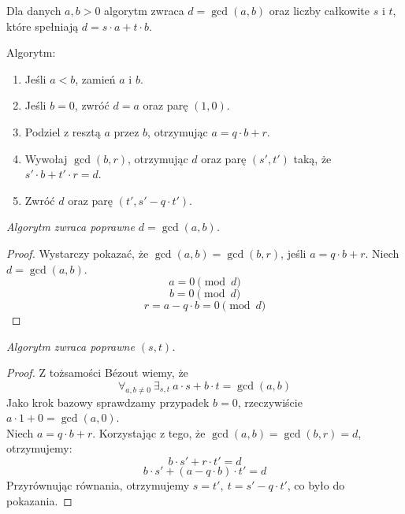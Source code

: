 Dla danych \( a, b > 0 \) algorytm zwraca \( d = \gcd(a,b) \) oraz liczby całkowite \( s \) i \( t \), które spełniają \( d = s\cdot a + t\cdot b \).

\begin{greyframe}
    Algorytm:
    \begin{enumerate}
        \item Jeśli \( a < b \), zamień \( a \) i \( b \).
        \item Jeśli \( b = 0 \), zwróć \( d = a \) oraz parę \( (1,0) \).
        \item Podziel z resztą \( a \) przez \( b \), otrzymując \( a = q \cdot b + r \).
        \item Wywołaj \( \gcd(b,r) \), otrzymując \( d \) oraz parę \( (s', t') \) taką, że \( s'\cdot b + t' \cdot r = d \).
        \item Zwróć \( d \) oraz parę \( (t', s' - q \cdot t') \).
    \end{enumerate}
\end{greyframe}

\vspace{1em}\noindent
\textit{Algorytm zwraca poprawne \( d = \gcd(a, b) \).}
\begin{proof}
    Wystarczy pokazać, że \( \gcd(a, b) = \gcd(b, r) \), jeśli \( a = q \cdot b + r \). Niech \( d = \gcd(a, b) \).
    \[
        a = 0 \pmod{d}
    \]
    \[
        b = 0 \pmod{d}
    \]
    \[
        r = a - q \cdot b = 0 \pmod{d}
    \]
\end{proof}
\textit{Algorytm zwraca poprawne \( (s, t) \).}
\begin{proof}
    Z tożsamości B\'ezout wiemy, że
    \[
        \forall_{a, b \not= 0 } \ \exists_{s, t} \ a \cdot s + b \cdot t = \gcd(a, b)
    \]
    Jako krok bazowy sprawdzamy przypadek \( b = 0 \), rzeczywiście \( a \cdot 1 + 0 = \gcd(a, 0) \). \\
    Niech \( a = q \cdot b + r \). Korzystając z tego, że \( \gcd(a, b) = \gcd(b, r) = d \), otrzymujemy:
    \[
        b \cdot s' + r \cdot t' = d
    \]
    \[
        b \cdot s' + (a - q \cdot b) \cdot t' = d
    \]
    Przyrównując równania, otrzymujemy \( s = t', \ t = s' - q \cdot t' \), co było do pokazania.
\end{proof}

